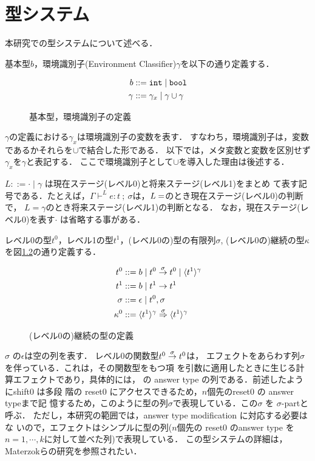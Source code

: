 \chapter{型システム}
\label{chap:type_system}

本研究での型システムについて述べる．

基本型$b$，環境識別子(Environment Classifier)$\gamma$を以下の通り定義する．

\begin{figure}[H]
  \centering
  \begin{align*}
    b & ::= \mbox{\texttt{int}} \mid \mbox{\texttt{bool}} \\
    \gamma & ::= \gamma_x \mid \gamma \cup \gamma
  \end{align*}
  \caption{基本型，環境識別子の定義}
  \label{fig:bec_def}
\end{figure}

$\gamma$の定義における$\gamma_x$は環境識別子の変数を表す．
すなわち，環境識別子は，変数であるかそれらを$\cup$で結合した形である．
以下では，メタ変数と変数を区別せず$\gamma_x$を$\gamma$と表記する．
ここで環境識別子として$\cup$を導入した理由は後述する．

$L ::= \cdot \mid \gamma$ は現在ステージ(レベル0)と将来ステージ(レベル1)をまとめ
て表す記号である．たとえば，$\Gamma \vdash^L
e:t~;~\sigma$は，$L=\empty$のとき現在ステージ(レベル0)の判断で，
$L=\gamma$のとき将来ステージ(レベル1)の判断となる．
なお，現在ステージ(レベル0)を表す$\cdot$ は省略する事がある．

レベル0の型$t^0$，レベル1の型$t^1$，(レベル0の)型の有限列$\sigma$,
(レベル0の)継続の型$\kappa$を図\ref{fig:k_def}の通り定義する．

\begin{figure}[H]
  \centering
  \begin{align*}
    t^0 & ::= b \mid {t^0} \stackrel{\sigma}{\rightarrow} {t^0} \mid \langle{t^1}\rangle^{\gamma} \\
    t^1 & ::= b \mid t^1 \to t^1 \\
    \sigma & ::= \epsilon \mid t^0, \sigma \\
    \kappa^0 & ::= {\langle{t^1}\rangle^{\gamma}} \stackrel{\sigma}{\Rightarrow} {\langle{t^1}\rangle^{\gamma}}
  \end{align*}
  \caption{(レベル0の)継続の型の定義}
  \label{fig:k_def}
\end{figure}

$\sigma$ の$\epsilon$は空の列を表す．
レベル0の関数型${t^0} \stackrel{\sigma}{\rightarrow} {t^0}$は，
エフェクトをあらわす列$\sigma$を伴っている．これは，その関数型をもつ項
を引数に適用したときに生じる計算エフェクトであり，具体的には，
\Shiftz の answer type の列である．前述したようにshift0 は多段
階の reset0 にアクセスできるため，$n$個先のreset0 の answer typeまで記
憶するため，このように型の列$\sigma$で表現している．この$\sigma$ を $\sigma$-partと呼ぶ．
ただし，本研究の範囲では，answer type modification に対応する必要はな
いので，エフェクトはシンプルに型の列($n$個先の reset0 のanswer type を
$n=1,\cdots,k$に対して並べた列)で表現している．
この型システムの詳細は，Materzokら\cite{Materzok2011}の研究を参照されたい．


